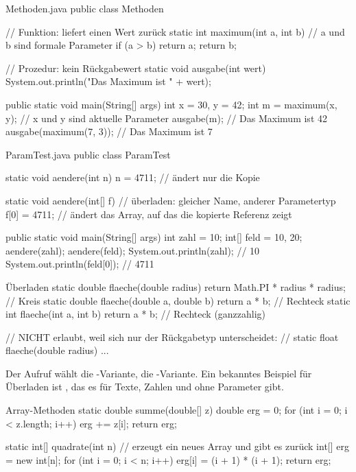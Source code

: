 \beispiele
{}
\begin{javacode}{Methoden.java}
public class Methoden {
	// Funktion: liefert einen Wert zurück
	static int maximum(int a, int b) {          // a und b sind formale Parameter
		if (a > b) {
			return a;
		}
		return b;
	}

	// Prozedur: kein Rückgabewert
	static void ausgabe(int wert) {
		System.out.println("Das Maximum ist " + wert);
	}

	public static void main(String[] args) {
		int x = 30, y = 42;
		int m = maximum(x, y);                  // x und y sind aktuelle Parameter
		ausgabe(m);                             // Das Maximum ist 42
		ausgabe(maximum(7, 3));                 // Das Maximum ist 7
	}
}
\end{javacode}

\begin{javacode}{ParamTest.java}
public class ParamTest {
	static void aendere(int n) {
		n = 4711;                   // ändert nur die Kopie
	}

	static void aendere(int[] f) {  // überladen: gleicher Name, anderer Parametertyp
		f[0] = 4711;                // ändert das Array, auf das die kopierte Referenz zeigt
	}

	public static void main(String[] args) {
		int zahl = 10;
		int[] feld = {10, 20};
		aendere(zahl);
		aendere(feld);
		System.out.println(zahl);       // 10
		System.out.println(feld[0]);    // 4711
	}
}
\end{javacode}

\begin{javacode}[Ausschnitt]{Überladen}
static double flaeche(double radius) { return Math.PI * radius * radius; }     // Kreis
static double flaeche(double a, double b) { return a * b; }                    // Rechteck
static int flaeche(int a, int b) { return a * b; }                             // Rechteck (ganzzahlig)

// NICHT erlaubt, weil sich nur der Rückgabetyp unterscheidet:
// static float flaeche(double radius) { ... }
\end{javacode}
Der Aufruf  wählt die -Variante,  die -Variante. Ein bekanntes Beispiel für Überladen ist , das es für Texte, Zahlen und ohne Parameter gibt.

\begin{javacode}[Ausschnitt]{Array-Methoden}
static double summe(double[] z) {
	double erg = 0;
	for (int i = 0; i < z.length; i++) {
		erg += z[i];
	}
	return erg;
}

static int[] quadrate(int n) {          // erzeugt ein neues Array und gibt es zurück
	int[] erg = new int[n];
	for (int i = 0; i < n; i++) {
		erg[i] = (i + 1) * (i + 1);
	}
	return erg;
}
\end{javacode}

